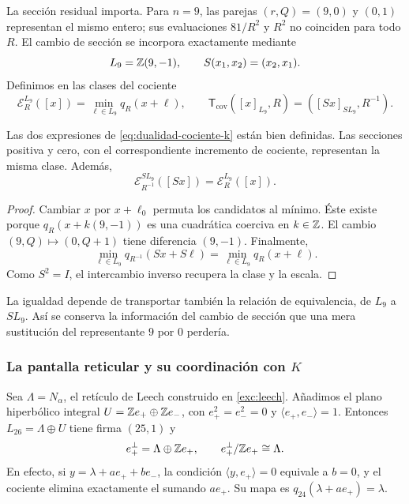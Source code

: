 La sección residual importa. Para \(n=9\), las parejas
\((r,Q)=(9,0)\) y \((0,1)\) representan el mismo entero;
sus evaluaciones \(81/R^2\) y \(R^2\) no coinciden para todo
\(R\). El cambio de sección se incorpora exactamente mediante
\[
 L_9=\mathbb Z(9,-1),\qquad S(x_1,x_2)=(x_2,x_1).
\]
Definimos en las clases del cociente
\begin{equation}
 \mathcal E_R^{L_9}([x])=\min_{\ell\in L_9}q_R(x+\ell),
 \qquad
 \mathsf T_{\mathrm{cov}}([x]_{L_9},R)
       =([Sx]_{SL_9},R^{-1}).
 \label{eq:dualidad-cociente-k}
\end{equation}

\begin{proposition}
Las dos expresiones de \eqref{eq:dualidad-cociente-k} están bien
definidas. Las secciones positiva y cero, con el correspondiente
incremento de cociente, representan la misma clase. Además,
\[
 \mathcal E_{R^{-1}}^{SL_9}([Sx])=\mathcal E_R^{L_9}([x]).
\]
\end{proposition}
\begin{proof}
Cambiar \(x\) por \(x+\ell_0\) permuta los candidatos al mínimo.
Éste existe porque \(q_R(x+k(9,-1))\) es una cuadrática coerciva
en \(k\in\mathbb Z\). El cambio \((9,Q)\mapsto(0,Q+1)\)
tiene diferencia \((9,-1)\). Finalmente,
\[
 \min_{\ell\in L_9}q_{R^{-1}}(Sx+S\ell)
 =\min_{\ell\in L_9}q_R(x+\ell).
\]
Como \(S^2=I\), el intercambio inverso recupera la clase y la escala.
\end{proof}

La igualdad depende de transportar también la relación de equivalencia,
de \(L_9\) a \(SL_9\). Así se conserva la información del cambio
de sección que una mera sustitución del representante \(9\) por
\(0\) perdería.

\subsubsection{La pantalla reticular y su coordinación con \(K\)}

Sea \(\Lambda=N_\alpha\), el retículo de Leech construido en
\ref{exc:leech}. Añadimos el plano hiperbólico integral
\(U=\mathbb Z e_+\oplus\mathbb Z e_-\), con
\(e_+^2=e_-^2=0\) y \(\langle e_+,e_-\rangle=1\).
Entonces \(L_{26}=\Lambda\oplus U\) tiene firma \((25,1)\) y
\[
 e_+^\perp=\Lambda\oplus\mathbb Z e_+,
 \qquad e_+^\perp/\mathbb Z e_+\cong\Lambda.
\]
En efecto, si \(y=\lambda+ae_++be_-\), la condición
\(\langle y,e_+\rangle=0\) equivale a \(b=0\), y el cociente
elimina exactamente el sumando \(ae_+\). Su mapa es
\(q_{24}(\lambda+ae_+)=\lambda\).

